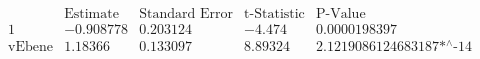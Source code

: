\[\begin{array}{l|llll}
 \text{} & \text{Estimate} & \text{Standard Error} & \text{t-Statistic} & \text{P-Value} \\
\hline
 1 & -0.908778 & 0.203124 & -4.474 & 0.0000198397 \\
 \text{vEbene} & 1.18366 & 0.133097 & 8.89324 & \text{2.1219086124683187$\grave{ }$*${}^{\wedge}$-14} \\
\end{array}\]

